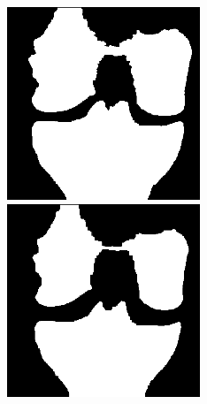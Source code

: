 \begin{figure}[H]
  \includegraphics[width=\linewidth]{imgs/orig_seg1.png}
\endminipage\hfill
{}
  \includegraphics[width=\linewidth]{imgs/noisy_seg1.png}

\end{figure}
